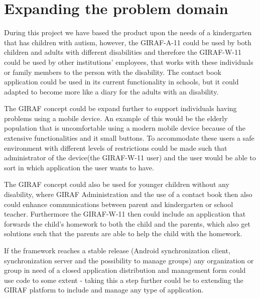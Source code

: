 \section{Expanding the problem domain}
During this project we have based the product upon the needs of a kindergarten that has children with autism, however, the GIRAF-A-11 could be used by both children and adults with different disabilities and therefore the GIRAF-W-11 could be used by other institutions' employees, that works with these individuals or family members to the person with the disability. The contact book application could be used in its current functionality in schools, but it could adapted to become more like a diary for the adults with an disability.     

The GIRAF concept could be expand further to support individuals having problems using a mobile device. An example of this would be the elderly population that is uncomfortable using a modern mobile device because of the extensive functionalities and it small buttons. To accommodate these users a safe environment with different levels of restrictions could be made such that administrator of the device(the GIRAF-W-11 user) and the user would be able to sort in which application the user wants to have.

The GIRAF concept could also be used for younger children without any disability, where GIRAF Administration and the use of a contact book then also could enhance communications between parent and kindergarten or school teacher. Furthermore the GIRAF-W-11 then could include an application that forwards the child's homework to both the child and the parents, which also get solutions such that the parents are able to help the child with the homework. 

If the framework reaches a stable release (Android synchronization client, synchronization server and the possibility to manage groups) any organization or group in need of a closed application distribution and management form could use code to some extent - taking this a step further could be to extending the GIRAF platform to include and manage any type of application. 

    